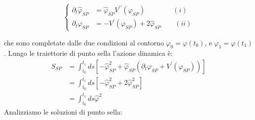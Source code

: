 \begin{tcolorbox}[colback=colorA!5, colframe=colorA, arc=3mm, boxrule=1.2pt]
\begin{equation}
\begin{cases} 
\partial_{t} \hat{\varphi}_{SP} &= \hat{\varphi}_{SP} V^{\prime\prime}(\varphi_{SP}) \quad \quad  \quad \quad(i) \\ 
\partial_{t} \varphi_{SP} &= - V^{\prime}(\varphi_{SP}) +2 \hat{\varphi}_{SP}  \quad \quad(ii) \label{eq:traj_ii} 
\end{cases}
\end{equation}
\end{tcolorbox}
che sono completate dalle due condizioni al contorno $\varphi_{0}=\varphi(t_{0})$, e $\varphi_{1}=\varphi(t_{1})$.
Lungo le traiettorie di punto sella l'azione dinamica è:
\begin{align}
S_{SP}&=\int_{t_{0}}^{t_{1}}ds[-\hat{\varphi}_{SP}^{2}+\hat{\varphi}_{SP}(\partial_{t}\varphi_{SP}+V^{\prime}(\varphi_{SP}))]\nonumber \\ 
&=\int_{t_{0}}^{t_{1}}ds[-\hat{\varphi}_{SP}^{2}+2\hat{\varphi}_{SP}^{2}] \nonumber \\ 
&=\int_{t_{0}}^{t_{1}}ds\hat{\varphi}^{2}
\end{align}
Analizziamo le soluzioni di punto sella:

